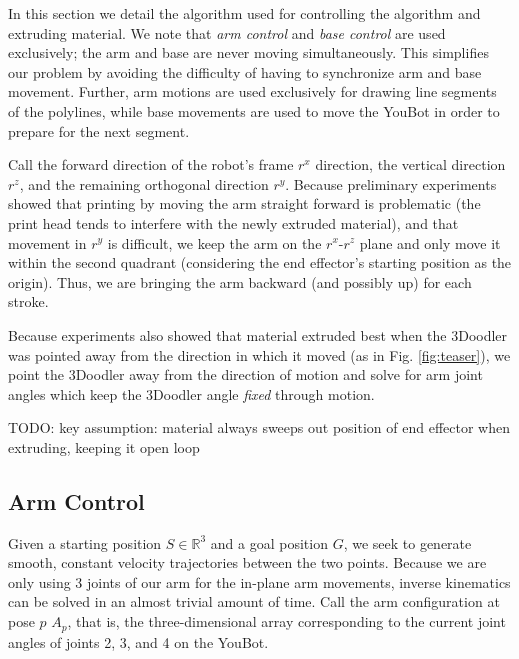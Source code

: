 \documentclass[conference]{acmsiggraph}
\begin{document}
In this section we detail the algorithm used for controlling the algorithm and extruding material.  We note that \emph{arm control} and \emph{base control} are used exclusively; the arm and base are never moving simultaneously.  This simplifies our problem by avoiding the difficulty of having to synchronize arm and base movement.  Further, arm motions are used exclusively for drawing line segments of the polylines, while base movements are used to move the YouBot in order to prepare for the next segment.  

Call the forward direction of the robot's frame $r^x$ direction, the vertical direction $r^z$, and the remaining orthogonal direction $r^y$.  Because preliminary experiments showed that printing by moving the arm straight forward is problematic (the print head tends to interfere with the newly extruded material), and that movement in $r^y$ is difficult, we keep the arm on the $r^x$-$r^z$ plane and only move it within the second quadrant (considering the end effector's starting position as the origin).  Thus, we are bringing the arm backward (and possibly up) for each stroke.

Because experiments also showed that material extruded best when the 3Doodler was pointed away from the direction in which it moved (as in Fig. \ref{fig:teaser}), we point the 3Doodler away from the direction of motion and solve for arm joint angles which keep the 3Doodler angle \emph{fixed} through motion.

TODO: key assumption: material always sweeps out position of end effector when extruding, keeping it open loop

\subsection{Arm Control}
Given a starting position $S \in \mathbb{R}^3$ and a goal position $G$, we seek to generate smooth, constant velocity trajectories between the two points.  Because we are only using 3 joints of our arm for the in-plane arm movements, inverse kinematics can be solved in an almost trivial amount of time.  Call the arm configuration at pose $p$ $A_p$, that is, the three-dimensional array corresponding to the current joint angles of joints 2, 3, and 4 on the YouBot.
\end{document}
